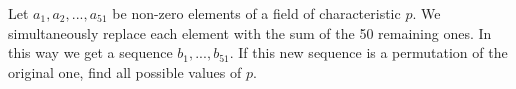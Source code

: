 Let $a_1, a_2,...,a_{51}$ be non-zero elements of a field of characteristic $p$. We simultaneously replace each element with the sum of the 50 remaining ones. In this way we get a sequence $b_1, ... , b_{51}$. If this new sequence is a permutation of the original one, find all possible values of $p$.